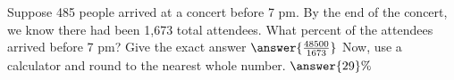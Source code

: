 \documentclass{ximera}
\author{David Kish}
\begin{document}
   \begin{exercise}
 Suppose 485 people arrived at a concert before 7 pm.  By the end of the concert, we know there had been 1,673 total attendees.  What percent of the attendees arrived before 7 pm? 
 Give the exact answer $\answer{\frac{48500}{1673}}$
 Now, use a calculator and round to the nearest whole number. $\answer{29}\%$ \calcHW
 \end{exercise}
\end{document}
